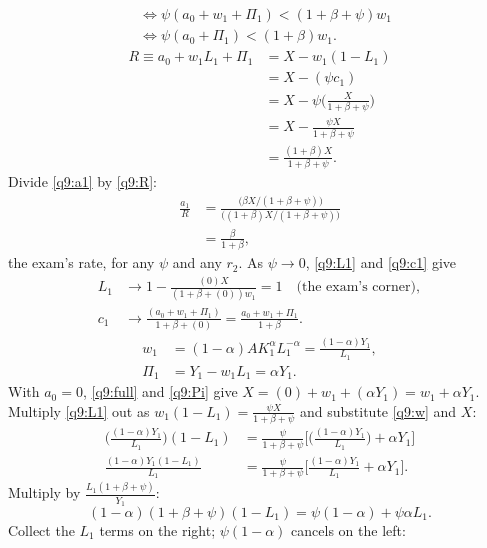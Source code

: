 \begin{sol}
\begin{align}
&\iff \psi(a_0+w_1+\Pi_1)<(1+\beta+\psi)w_1\nonumber\\
&\iff \psi(a_0+\Pi_1)<(1+\beta)w_1. \label{q9:int}
\end{align}
\begin{align}
R\equiv a_0+w_1L_1+\Pi_1 &= X-w_1(1-L_1)\nonumber\\
&= X-(\psi c_1)\nonumber\\
&= X-\psi\Big(\frac{X}{1+\beta+\psi}\Big)\nonumber\\
&= X-\frac{\psi X}{1+\beta+\psi}\nonumber\\
&= \frac{(1+\beta)X}{1+\beta+\psi}. \label{q9:R}
\end{align}
Divide \eqref{q9:a1} by \eqref{q9:R}:
\begin{align*}
\frac{a_1}{R} &= \frac{\big(\beta X/(1+\beta+\psi)\big)}{\big((1+\beta)X/(1+\beta+\psi)\big)}\\
&= \frac{\beta}{1+\beta},
\end{align*}
the exam's rate, for any $\psi$ and any $r_2$. As $\psi\to0$, \eqref{q9:L1} and \eqref{q9:c1} give
\begin{align*}
L_1 &\to 1-\frac{(0)X}{(1+\beta+(0))w_1}=1\quad\text{(the exam's corner)},\\
c_1 &\to \frac{(a_0+w_1+\Pi_1)}{1+\beta+(0)}=\frac{a_0+w_1+\Pi_1}{1+\beta}.
\end{align*}
\begin{align}
w_1 &= (1-\alpha)AK_1^\alpha L_1^{-\alpha}=\frac{(1-\alpha)Y_1}{L_1}, \label{q9:w}\\
\Pi_1 &= Y_1-w_1L_1=\alpha Y_1. \label{q9:Pi}
\end{align}
With $a_0=0$, \eqref{q9:full} and \eqref{q9:Pi} give $X=(0)+w_1+(\alpha Y_1)=w_1+\alpha Y_1$. Multiply \eqref{q9:L1} out as
$w_1(1-L_1)=\frac{\psi X}{1+\beta+\psi}$ and substitute \eqref{q9:w} and $X$:
\begin{align*}
\Big(\frac{(1-\alpha)Y_1}{L_1}\Big)(1-L_1) &= \frac{\psi}{1+\beta+\psi}\Big[\Big(\frac{(1-\alpha)Y_1}{L_1}\Big)+\alpha Y_1\Big]\\
\frac{(1-\alpha)Y_1(1-L_1)}{L_1} &= \frac{\psi}{1+\beta+\psi}\Big[\frac{(1-\alpha)Y_1}{L_1}+\alpha Y_1\Big].
\end{align*}
Multiply by $\frac{L_1(1+\beta+\psi)}{Y_1}$:
\[
(1-\alpha)(1+\beta+\psi)(1-L_1)=\psi(1-\alpha)+\psi\alpha L_1 .
\]
Collect the $L_1$ terms on the right; $\psi(1-\alpha)$ cancels on the left:

\end{sol}
